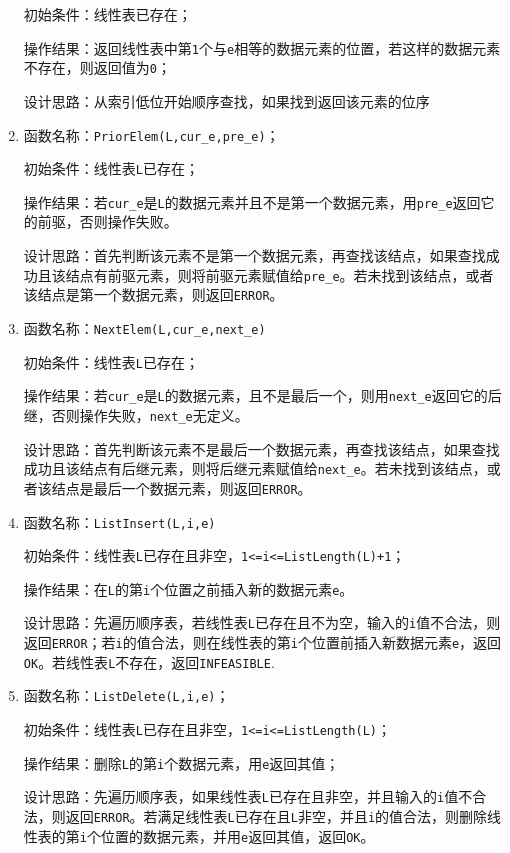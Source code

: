 \documentclass[supercite]{Experimental_Report}
\theoremstyle{definition}
\begin{document}
\begin{enumerate}
初始条件：线性表已存在；

操作结果：返回线性表中第\verb|1|个与\verb|e|相等的数据元素的位置，若这样的数据元素不存在，则返回值为\verb|0|；

设计思路：从索引低位开始顺序查找，如果找到返回该元素的位序

\item 函数名称：\verb|PriorElem(L,cur_e,pre_e)|；

初始条件：线性表\verb|L|已存在；

操作结果：若\verb|cur_e|是\verb|L|的数据元素并且不是第一个数据元素，用\verb|pre_e|返回它的前驱，否则操作失败。

设计思路：首先判断该元素不是第一个数据元素，再查找该结点，如果查找成功且该结点有前驱元素，则将前驱元素赋值给\verb|pre_e|。若未找到该结点，或者该结点是第一个数据元素，则返回\verb|ERROR|。

\item 函数名称：\verb|NextElem(L,cur_e,next_e)|

初始条件：线性表\verb|L|已存在；

操作结果：若\verb|cur_e|是\verb|L|的数据元素，且不是最后一个，则用\verb|next_e|返回它的后继，否则操作失败，\verb|next_e|无定义。

设计思路：首先判断该元素不是最后一个数据元素，再查找该结点，如果查找成功且该结点有后继元素，则将后继元素赋值给\verb|next_e|。若未找到该结点，或者该结点是最后一个数据元素，则返回\verb|ERROR|。

\item 函数名称：\verb|ListInsert(L,i,e)|

初始条件：线性表\verb|L|已存在且非空，\verb|1<=i<=ListLength(L)+1|；

操作结果：在\verb|L|的第\verb|i|个位置之前插入新的数据元素\verb|e|。

设计思路：先遍历顺序表，若线性表\verb|L|已存在且不为空，输入的\verb|i|值不合法，则返回\verb|ERROR|；若\verb|i|的值合法，则在线性表的第\verb|i|个位置前插入新数据元素\verb|e|，返回\verb|OK|。若线性表\verb|L|不存在，返回\verb|INFEASIBLE|.

\item 函数名称：\verb|ListDelete(L,i,e)|；

初始条件：线性表\verb|L|已存在且非空，\verb|1<=i<=ListLength(L)|；

操作结果：删除\verb|L|的第\verb|i|个数据元素，用\verb|e|返回其值；

设计思路：先遍历顺序表，如果线性表\verb|L|已存在且非空，并且输入的\verb|i|值不合法，则返回\verb|ERROR|。若满足线性表\verb|L|已存在且\verb|L|非空，并且\verb|i|的值合法，则删除线性表的第\verb|i|个位置的数据元素，并用\verb|e|返回其值，返回\verb|OK|。


\end{enumerate}
\end{document}
